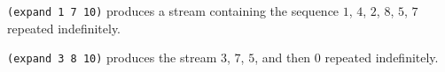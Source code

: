 \documentclass[a4paper,12pt]{article}
\begin{document}
\lstinline!(expand 1 7 10)! produces a stream containing the sequence
$1$, $4$, $2$, $8$, $5$, $7$ repeated indefinitely.

\lstinline!(expand 3 8 10)! produces the stream $3$, $7$, $5$, and
then $0$ repeated indefinitely.
\end{document}
